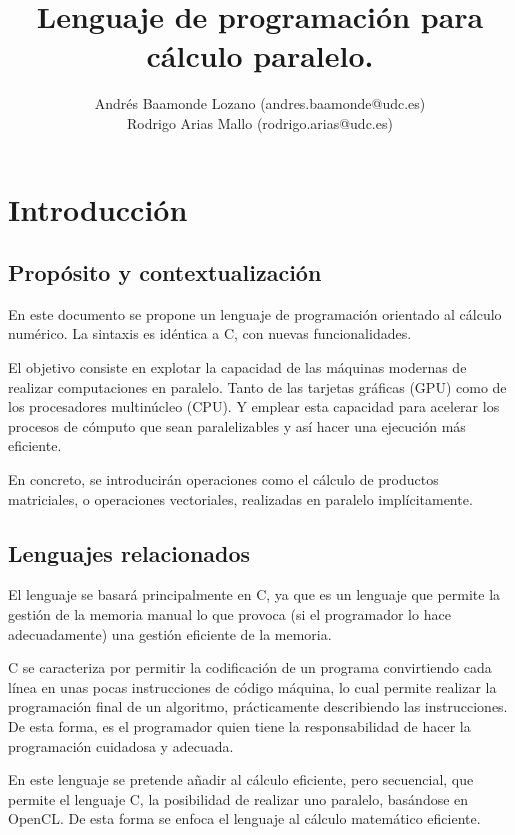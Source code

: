 \documentclass[12pt,a4paper]{article}
\title{Lenguaje de programación para cálculo paralelo.}
\author{Andrés Baamonde Lozano (andres.baamonde@udc.es)\\
	Rodrigo Arias Mallo (rodrigo.arias@udc.es)}
\begin{document}
\maketitle

\clearpage 

\tableofcontents

\clearpage 



\section{Introducción}

\subsection
{Propósito y contextualización}
En este documento se propone un lenguaje de programación orientado al cálculo 
numérico. La sintaxis es idéntica a C, con nuevas funcionalidades.

El objetivo consiste en explotar la capacidad de las máquinas modernas de 
realizar computaciones en paralelo. Tanto de las tarjetas gráficas (GPU) como de 
los procesadores multinúcleo (CPU). Y emplear esta capacidad para acelerar los 
procesos de cómputo que sean paralelizables y así hacer una ejecución más eficiente.

En concreto, se introducirán operaciones como el cálculo de productos 
matriciales, o operaciones vectoriales, realizadas en paralelo implícitamente.

\subsection
{Lenguajes relacionados}
El lenguaje se basará principalmente en C, ya que es un lenguaje que permite
la gestión de la memoria manual lo que provoca (si el programador lo hace
adecuadamente) una gestión eficiente de la memoria.

C se caracteriza por permitir la codificación de un programa convirtiendo cada 
línea en unas pocas instrucciones de código máquina, lo cual permite realizar la 
programación final de un algoritmo, prácticamente describiendo las 
instrucciones. De esta forma, es el programador quien tiene la responsabilidad 
de hacer la programación cuidadosa y adecuada.

En este lenguaje se pretende añadir al cálculo eficiente, pero secuencial, que 
permite el lenguaje C, la posibilidad de realizar uno paralelo, basándose en 
OpenCL. De esta forma se enfoca el lenguaje al cálculo matemático eficiente.
\end{document}
